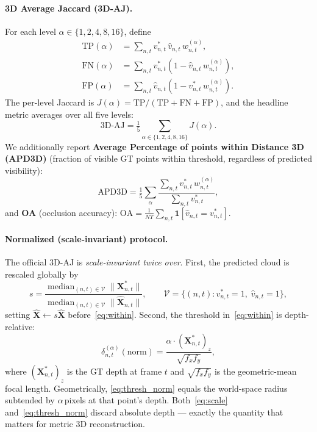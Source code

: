 \documentclass[11pt,a4paper]{article}
\begin{document}
\paragraph{3D Average Jaccard (3D-AJ).}
For each level $\alpha\in\{1,2,4,8,16\}$, define
\begin{align}
  \mathrm{TP}(\alpha) &= \textstyle\sum_{n,t} v^*_{n,t}\,\hat{v}_{n,t}\,w^{(\alpha)}_{n,t},
  \label{eq:tp}\\
  \mathrm{FN}(\alpha) &= \textstyle\sum_{n,t} v^*_{n,t}\!\left(1-\hat{v}_{n,t}\,w^{(\alpha)}_{n,t}\right),
  \label{eq:fn}\\
  \mathrm{FP}(\alpha) &= \textstyle\sum_{n,t} \hat{v}_{n,t}\!\left(1-v^*_{n,t}\,w^{(\alpha)}_{n,t}\right).
  \label{eq:fp}
\end{align}
The per-level Jaccard is $J(\alpha)=\mathrm{TP}/(\mathrm{TP}+\mathrm{FN}+\mathrm{FP})$, and
the headline metric averages over all five levels:
\begin{equation}
  \text{3D-AJ} = \tfrac{1}{5}\!\sum_{\alpha\in\{1,2,4,8,16\}}\!J(\alpha).
  \label{eq:3daj}
\end{equation}
We additionally report \textbf{Average Percentage of points within Distance 3D (APD3D)}
(fraction of visible GT points within threshold, regardless of predicted visibility):
\begin{equation}
  \text{APD3D} = \tfrac{1}{5}\!\sum_{\alpha}
  \frac{\sum_{n,t} v^*_{n,t}\,w^{(\alpha)}_{n,t}}{\sum_{n,t} v^*_{n,t}},
  \label{eq:apd3d}
\end{equation}
and \textbf{OA} (occlusion accuracy):
$\text{OA}=\frac{1}{NT}\sum_{n,t}\mathbf{1}[\hat{v}_{n,t}=v^*_{n,t}]$.

\paragraph{Normalized (scale-invariant) protocol.}
The official 3D-AJ is \emph{scale-invariant twice over}.
First, the predicted cloud is rescaled globally by
\begin{equation}
  s = \frac{\operatorname{median}_{(n,t)\in\mathcal{V}}
            \lVert\mathbf{X}^*_{n,t}\rVert}
           {\operatorname{median}_{(n,t)\in\mathcal{V}}
            \lVert\hat{\mathbf{X}}_{n,t}\rVert},
  \qquad
  \mathcal{V}=\{(n,t): v^*_{n,t}=1,\;\hat{v}_{n,t}=1\},
  \label{eq:scale}
\end{equation}
setting $\hat{\mathbf{X}}\leftarrow s\hat{\mathbf{X}}$ before~\eqref{eq:within}.
Second, the threshold in~\eqref{eq:within} is depth-relative:
\begin{equation}
  \delta^{(\alpha)}_{n,t}(\text{norm})
  = \frac{\alpha\cdot(\mathbf{X}^*_{n,t})_z}{\sqrt{f_x f_y}},
  \label{eq:thresh_norm}
\end{equation}
where $(\mathbf{X}^*_{n,t})_z$ is the GT depth at frame $t$ and $\sqrt{f_x f_y}$ is the
geometric-mean focal length.
Geometrically, \eqref{eq:thresh_norm} equals the world-space radius subtended by
$\alpha$\,pixels at that point's depth.
Both~\eqref{eq:scale} and~\eqref{eq:thresh_norm} discard absolute depth ---
exactly the quantity that matters for metric 3D reconstruction.
\end{document}
